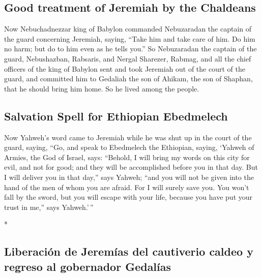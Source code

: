 \begin{paracol}{2}
\begin{otherlanguage}{english}
\hypertarget{good-treatment-of-jeremiah-by-the-chaldeans}{%
\subsection{Good treatment of Jeremiah by the
Chaldeans}\label{good-treatment-of-jeremiah-by-the-chaldeans}}

 Now Nebuchadnezzar king of Babylon commanded Nebuzaradan
the captain of the guard concerning Jeremiah, saying, 
``Take him and take care of him. Do him no harm; but do to him even as
he tells you.''  So Nebuzaradan the captain of the guard,
Nebushazban, Rabsaris, and Nergal Sharezer, Rabmag, and all the chief
officers of the king of Babylon  sent and took Jeremiah
out of the court of the guard, and committed him to Gedaliah the son of
Ahikam, the son of Shaphan, that he should bring him home. So he lived
among the people.

\hypertarget{salvation-spell-for-ethiopian-ebedmelech}{%
\subsection{Salvation Spell for Ethiopian
Ebedmelech}\label{salvation-spell-for-ethiopian-ebedmelech}}

 Now Yahweh's word came to Jeremiah while he was shut up
in the court of the guard, saying,  ``Go, and speak to
Ebedmelech the Ethiopian, saying, `Yahweh of Armies, the God of Israel,
says: ``Behold, I will bring my words on this city for evil, and not for
good; and they will be accomplished before you in that day.
 But I will deliver you in that day,'' says Yahweh; ``and
you will not be given into the hand of the men of whom you are afraid.
 For I will surely save you. You won't fall by the sword,
but you will escape with your life, because you have put your trust in
me,'' says Yahweh.'\,''

\end{otherlanguage}

\switchcolumn[0]*

\hypertarget{liberaciuxf3n-de-jeremuxedas-del-cautiverio-caldeo-y-regreso-al-gobernador-gedaluxedas}{%
\subsection{Liberación de Jeremías del cautiverio caldeo y regreso al
gobernador
Gedalías}\label{liberaciuxf3n-de-jeremuxedas-del-cautiverio-caldeo-y-regreso-al-gobernador-gedaluxedas}}


\end{paracol}
